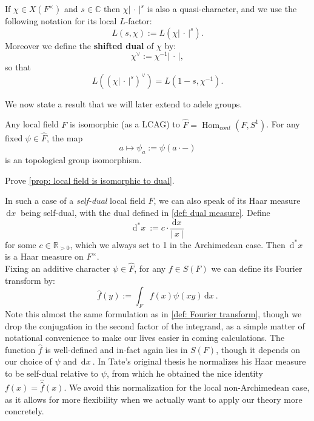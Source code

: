 \documentclass[11pt, x11names, openany]{book}
\newcommand{\rr}{\mathbb{R}}
\newcommand{\cc}{\mathbb{C}}
\renewcommand{\brack}[1]{\left(   #1 \right)}
\newcommand{\abs}[1]{\left| \, #1  \,\right|}
\renewcommand{\hat}{\widehat}
\DeclareMathOperator{\Hom}{Hom}
\newcommand{\inv}[1]{#1^{-1}}
\newcommand{\dx}{\, \mathrm{d}x \ }
\renewcommand{\d}[1]{\, \mathrm{d}#1 \ }
\begin{document}
\begin{defn}
\label{def: shifted dual and L(s, chi) notation}
    If $\chi \in X(F^\times)$ and $s \in \cc$ then $\chi \abs{\cdot}^s$ is also a quasi-character, and we use the following notation for its local $L$-factor:
    \begin{equation*}
        L(s, \chi) := L(\chi \abs{\cdot}^s).
    \end{equation*}
    Moreover we define the \textbf{shifted dual} of $\chi$ by:
    \begin{equation*}
        \chi^\lor := \inv{\chi}\abs{\cdot},
    \end{equation*}
    so that
    \begin{equation*}
        L\brack{(\chi \abs{\cdot}^s)^\lor} = L\brack{1-s, \inv{\chi}}.
    \end{equation*}
\end{defn}

We now state a result that we will later extend to adele groups.
\begin{prop}
\label{prop: local field is isomorphic to dual}
Any local field $F$ is isomorphic (as a LCAG) to $\hat{F} = \Hom_{cont}(F, S^1)$. For any fixed $\psi \in \hat{F}$, the map
\begin{equation*}
    a \mapsto \psi_a := \psi(a \cdot  -)
\end{equation*}
is an topological group isomorphism.
\end{prop}
\begin{exercise}
    Prove \ref{prop: local field is isomorphic to dual}.
\end{exercise}

In such a case of a \textit{self-dual} local field $F$, we can also speak of its Haar measure $\dx$ being self-dual, with the dual defined in \ref{def: dual measure}. Define 
\begin{equation}
\label{eqn: measure on F^times}
    \d{^*x} := c \cdot \frac{\dx}{\abs{x}}
\end{equation}
for some $c \in \rr_{> 0}$, which we always set to 1 in the Archimedean case. Then $\d{^*x}$ is a Haar measure on $F^\times$.\\
Fixing an additive character $\psi \in \hat{F}$, for any $f \in S(F)$ we can define its Fourier transform by:
\begin{equation}
\label{eqn: Fourier transform local-zeta-func}
    \hat{f}(y) := \int_F f(x)\psi(xy)\dx.
\end{equation}
Note this almost the same formulation as in \ref{def: Fourier transform}, though we drop the conjugation in the second factor of the integrand, as a simple matter of notational convenience to make our lives easier in coming calculations. The function $\hat{f}$ is well-defined and in-fact again lies in $S(F)$, though it depends on our choice of $\psi$ and $\dx$. In Tate's original thesis he normalizes his Haar measure to be self-dual relative to $\psi$, from which he obtained the nice identity $f(x) = \hat{\hat{f}}(x)$. We avoid this normalization for the local non-Archimedean case, as it allows for more flexibility when we actually want to apply our theory more concretely.
\end{document}
